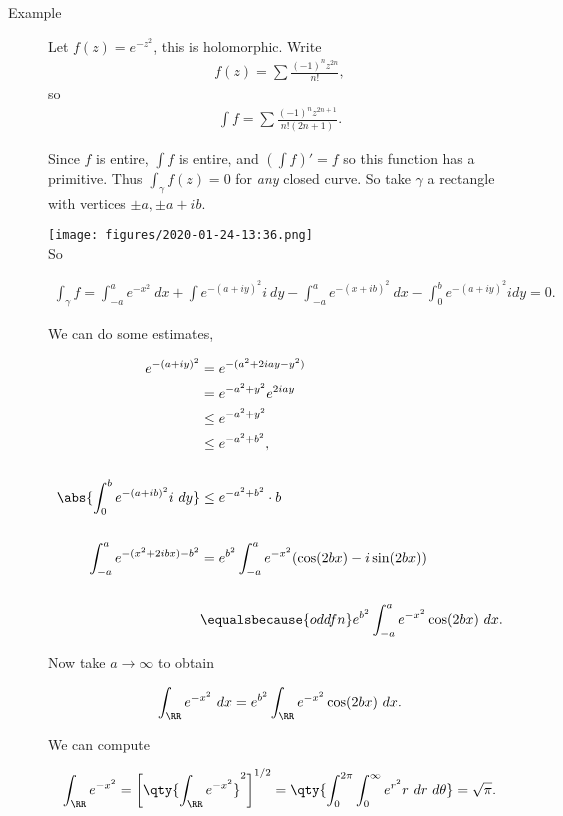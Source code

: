 \begin{description}
\item[Example]
Let \(f(z) = e^{-z^2}\), this is holomorphic. Write
\begin{align*}
f(z) = \sum  \frac{(-1)^nz^{2n}}{n!}
,\end{align*} so
\begin{align*}
\int f = \sum  \frac{ (-1)^n z^{2n+1} }{ n! (2n+1) }
.\end{align*}

Since \(f\) is entire, \(\int f\) is entire, and \((\int f)' = f\) so
this function has a primitive. Thus \(\int_\gamma f(z) = 0\) for
\emph{any} closed curve. So take \(\gamma\) a rectangle with vertices
\(\pm a , \pm a + ib\).

\texttt{[image: figures/2020-01-24-13:36.png]}\\

So

\begin{align*}
\int_\gamma f = \int_{-a}^a e^{-x^2} ~dx + \int e^{-(a+iy)^2} i ~dy - \int_{-a}^a e^{-(x+ib)^2} ~dx - \int_0^b e^{-(a+iy)^2} i dy = 0
.\end{align*}

We can do some estimates,

\begin{align*}
e^{-(a+iy)^2} 
&= e^{-(a^2 + 2iay - y^2)} \\
&= e^{-a^2 + y^2} e^{2iay} \\
&\leq e^{-a^2 + y^2} \\
&\leq e^{-a^2 + b^2}, \\ \\
\abs {\int_0^b e^{-(a+ib)^2} i ~dy} 
&\leq e^{-a^2 + b^2} \cdot b \\ \\
\int_{-a}^a e^{-(x^2 + 2ib x)-b^2} 
&= e^{b^2} \int_{-a}^a e^{-x^2} ( \cos(2bx) - i \sin(2bx) ) \\ \\
&\equalsbecause{odd fn} e^{b^2} \int_{-a}^a e^{-x^2} \cos(2bx) ~dx
.\end{align*}

Now take \(a\to \infty\) to obtain

\begin{align*}
\int_\RR e^{-x^2} ~dx = e^{b^2} \int_\RR e^{-x^2} \cos(2bx) ~dx
.\end{align*}

We can compute

\begin{align*}
\int_\RR e^{-x^2} = \left[ \qty{\int_\RR e^{-x^2}}^2 \right]^{1/2} = \qty{ \int_0^{2\pi} \int_0^\infty e^{r^2} r~dr~d\theta} = \sqrt{\pi}
.\end{align*}


\end{description}
